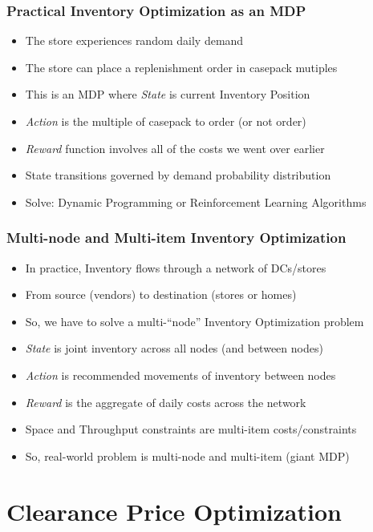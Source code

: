 \documentclass[handout]{beamer}
\begin{document}
\begin{frame}
\frametitle{Practical Inventory Optimization as an MDP}
\pause
\begin{itemize}[<+->]
\item The store experiences random daily demand
\item The store can place a replenishment order in casepack mutiples
\item This is an MDP where {\em State} is current Inventory Position
\item {\em Action} is the multiple of casepack to order (or not order)
\item {\em Reward} function involves all of the costs we went over earlier
\item State transitions governed by demand probability distribution
\item Solve: Dynamic Programming or Reinforcement Learning Algorithms
\end{itemize}
\end{frame}



\begin{frame}
\frametitle{Multi-node and Multi-item Inventory Optimization}
\pause
\begin{itemize}[<+->]
\item In practice, Inventory flows through a network of DCs/stores
\item From source (vendors) to destination (stores or homes)
\item So, we have to solve a multi-``node'' Inventory Optimization problem
\item {\em State} is joint inventory across all nodes (and between nodes)
\item {\em Action} is recommended movements of inventory between nodes
\item {\em Reward} is the aggregate of daily costs across the network
\item Space and Throughput constraints are multi-item costs/constraints
\item So, real-world problem is multi-node and multi-item (giant MDP)
\end{itemize}
\end{frame}

\section{Clearance Price Optimization}
\end{document}
